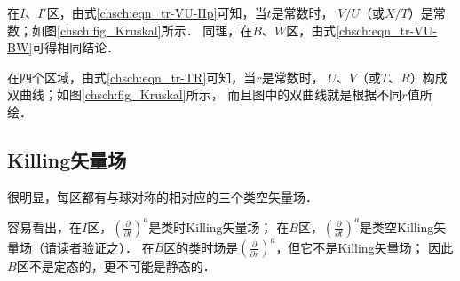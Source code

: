 在$I$、$I'$区，由式\eqref{chsch:eqn_tr-VU-IIp}可知，当$t$是常数时，
$V/U$（或$X/T$）是常数；如图\ref{chsch:fig_Kruskal}所示．
同理，在$B$、$W$区，由式\eqref{chsch:eqn_tr-VU-BW}可得相同结论．

在四个区域，由式\eqref{chsch:eqn_tr-TR}可知，当$r$是常数时，
$U$、$V$（或$T$、$R$）构成双曲线；如图\ref{chsch:fig_Kruskal}所示，
而且图中的双曲线就是根据不同$r$值所绘．


\subsection{Killing矢量场}


很明显，每区都有与球对称的相对应的三个类空矢量场．

容易看出，在$I$区，$(\frac{\partial }{\partial t})^a$是类时Killing矢量场；
在$B$区，$(\frac{\partial }{\partial t})^a$是类空Killing矢量场（请读者验证之）．
在$B$区的类时场是$(\frac{\partial }{\partial r})^a$，但它不是Killing矢量场；
因此$B$区不是定态的，更不可能是静态的．

